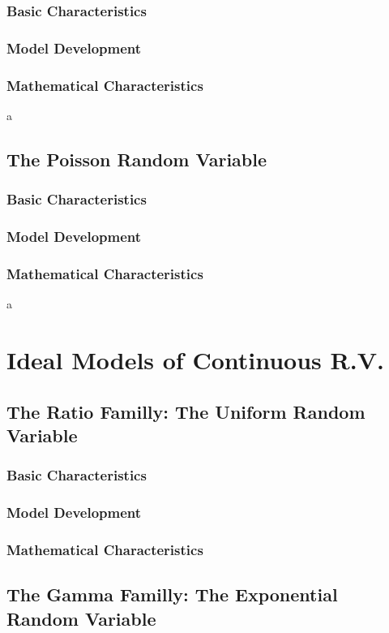 \documentclass[twoside]{article}
\theoremstyle{definition}
\theoremstyle{remark}
\theoremstyle{remark}
\begin{document}
\subsubsection{Basic Characteristics}
\subsubsection{Model Development}
\subsubsection{Mathematical Characteristics}
a
\subsection{The Poisson Random Variable}
\subsubsection{Basic Characteristics}
\subsubsection{Model Development}
\subsubsection{Mathematical Characteristics}
a

\section{Ideal Models of Continuous R.V.}

\subsection{The Ratio Familly: The Uniform Random Variable}
\subsubsection{Basic Characteristics}
\subsubsection{Model Development}
\subsubsection{Mathematical Characteristics}

\subsection{The Gamma Familly: The Exponential Random Variable}
\end{document}
